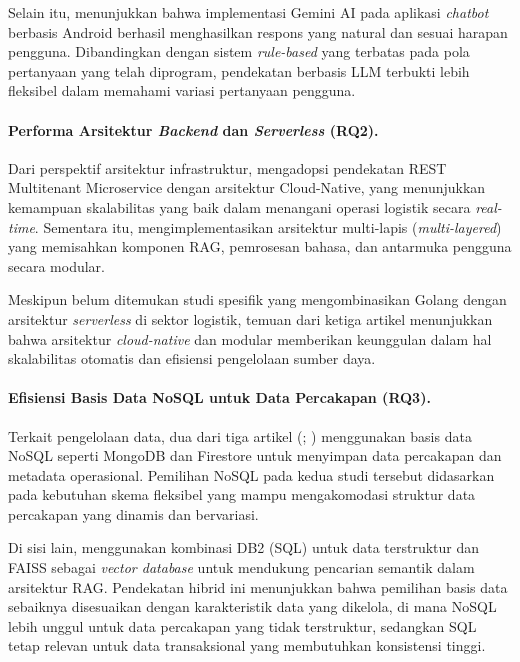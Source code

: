 Selain itu, \textcite{rachmat2024} menunjukkan bahwa implementasi Gemini AI pada aplikasi \textit{chatbot} berbasis Android berhasil menghasilkan respons yang natural dan sesuai harapan pengguna. Dibandingkan dengan sistem \textit{rule-based} yang terbatas pada pola pertanyaan yang telah diprogram, pendekatan berbasis LLM terbukti lebih fleksibel dalam memahami variasi pertanyaan pengguna.

\paragraph{Performa Arsitektur \textit{Backend} dan \textit{Serverless} (RQ2).}
Dari perspektif arsitektur infrastruktur, \textcite{garcia2025} mengadopsi pendekatan REST Multitenant Microservice dengan arsitektur Cloud-Native, yang menunjukkan kemampuan skalabilitas yang baik dalam menangani operasi logistik secara \textit{real-time}. Sementara itu, \textcite{aipowered2025} mengimplementasikan arsitektur multi-lapis (\textit{multi-layered}) yang memisahkan komponen RAG, pemrosesan bahasa, dan antarmuka pengguna secara modular.

Meskipun belum ditemukan studi spesifik yang mengombinasikan Golang dengan arsitektur \textit{serverless} di sektor logistik, temuan dari ketiga artikel menunjukkan bahwa arsitektur \textit{cloud-native} dan modular memberikan keunggulan dalam hal skalabilitas otomatis dan efisiensi pengelolaan sumber daya.

\paragraph{Efisiensi Basis Data NoSQL untuk Data Percakapan (RQ3).}
Terkait pengelolaan data, dua dari tiga artikel (\cite{garcia2025}; \cite{rachmat2024}) menggunakan basis data NoSQL seperti MongoDB dan Firestore untuk menyimpan data percakapan dan metadata operasional. Pemilihan NoSQL pada kedua studi tersebut didasarkan pada kebutuhan skema fleksibel yang mampu mengakomodasi struktur data percakapan yang dinamis dan bervariasi.

Di sisi lain, \textcite{aipowered2025} menggunakan kombinasi DB2 (SQL) untuk data terstruktur dan FAISS sebagai \textit{vector database} untuk mendukung pencarian semantik dalam arsitektur RAG. Pendekatan hibrid ini menunjukkan bahwa pemilihan basis data sebaiknya disesuaikan dengan karakteristik data yang dikelola, di mana NoSQL lebih unggul untuk data percakapan yang tidak terstruktur, sedangkan SQL tetap relevan untuk data transaksional yang membutuhkan konsistensi tinggi.
